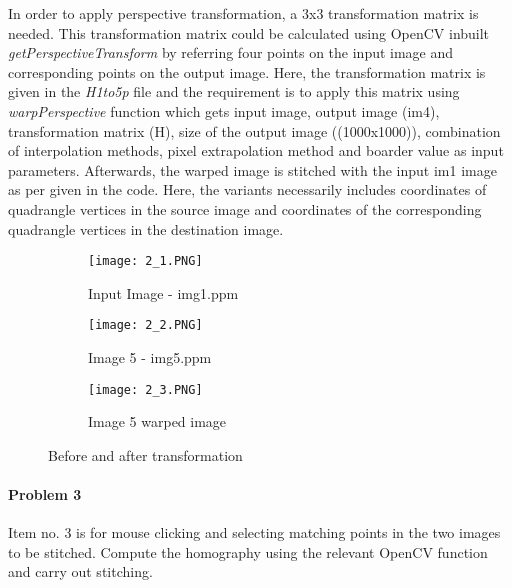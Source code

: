 \documentclass[11pt]{scrartcl}
\begin{document}
{In order to apply perspective transformation, a 3x3 transformation matrix is needed. This transformation matrix could be calculated using OpenCV inbuilt \textit{getPerspectiveTransform} by referring four points on the input image and corresponding points on the output image. Here, the transformation matrix is given in the \textit{H1to5p} file and the requirement is to apply this matrix using \textit{warpPerspective} function which gets input image, output image (im4), transformation matrix (H), size of the output image ((1000x1000)), combination of interpolation methods, pixel extrapolation method and boarder value as input parameters. Afterwards, the warped image is stitched with the input im1 image as per given in the code. Here, the variants necessarily includes coordinates of quadrangle vertices in the source image and coordinates of the corresponding quadrangle vertices in the destination image.
\begin{figure}[H]
\centering
\begin{subfigure}{0.4\textwidth}
  \centering
  \texttt{[image: 2\_1.PNG]}
  \caption{Input Image - img1.ppm}
  \label{fig:sub2}
\end{subfigure}
\begin{subfigure}{0.4\textwidth}
  \centering
  \texttt{[image: 2\_2.PNG]}
  \caption{Image 5 - img5.ppm}
  \label{fig:sub2}
\end{subfigure}
\begin{subfigure}{0.4\textwidth}
  \centering
  \texttt{[image: 2\_3.PNG]}
  \caption{Image 5 warped image}
  \label{fig:sub2}
\end{subfigure}
\caption{Before and after transformation}
\label{fig:test}
\end{figure}


\paragraph*{Problem 3}
Item no. 3 is for mouse clicking and selecting matching points in the two images to be stitched. Compute the homography using the relevant OpenCV function and carry out stitching.

}
\end{document}
